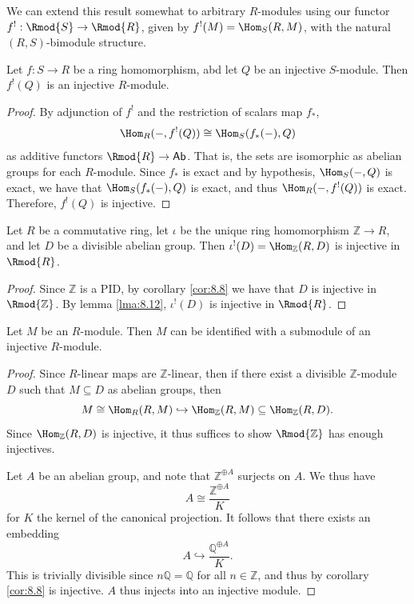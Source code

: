 We can extend this result somewhat to arbitrary $R$-modules using our functor $f^!: \Rmod{S}  \to \Rmod{R} $, given by $f^!(M)=\Hom_{S}(R, M) $, with the natural $(R,S)$-bimodule structure.
\begin{lemma}\label{lma:8.12}
	Let $f : S \to R$ be a ring homomorphism, abd let $Q$ be an injective $S$-module. Then $f^!(Q)$ is an injective $R$-module.
\end{lemma}
\begin{proof}
	By adjunction of $f^!$ and the restriction of scalars map $f_*$,
	\[
		\Hom_{R}(-, f^!(Q)) \cong \Hom_{S}(f_*(-), Q) 
	\]
	as additive functors $\Rmod{R} \to \mathsf{Ab} $. That is, the sets are isomorphic as abelian groups for each $R$-module. Since $f_*$ is exact and by hypothesis, $\Hom_{S}(-, Q) $ is exact, we have that $\Hom_{S}(f_*(-), Q) $ is exact, and thus $\Hom_{R}(-, f^!(Q)) $ is exact. Therefore, $f^!(Q)$ is injective.
\end{proof}
\begin{corollary}\label{cor:8.9}
	Let $R$ be a commutative ring, let $\iota $ be the unique ring homomorphism $\mathbb{Z} \to R$, and let $D$ be a divisible abelian group. Then $\iota ^!(D)=\Hom_{\mathbb{Z} }(R, D) $ is injective in $\Rmod{R} $.
\end{corollary}
\begin{proof}
	Since $\mathbb{Z} $ is a PID, by corollary \ref{cor:8.8} we have that $D$ is injective in $\Rmod{\mathbb{Z} } $. By lemma \ref{lma:8.12}, $\iota ^!(D)$ is injective in $\Rmod{R} $.
\end{proof}
\begin{corollary}\label{cor:8.10}
	Let $M$ be an $R$-module. Then $M$ can be identified with a submodule of an injective $R$-module.
\end{corollary}
\begin{proof}
	Since $R$-linear maps are $\mathbb{Z} $-linear, then if there exist a divisible $\mathbb{Z} $-module $D$ such that $M\subseteq D$ as abelian groups, then
	\[
		M\cong \Hom_{R}(R, M) \hookrightarrow \Hom_{\mathbb{Z} }(R, M) \subseteq \Hom_{\mathbb{Z} }(R, D) 
	.\]
	Since $\Hom_{\mathbb{Z} }(R, D) $ is injective, it thus suffices to show $\Rmod{\mathbb{Z} } $ has enough injectives.

	Let $A$ be an abelian group, and note that $\mathbb{Z} ^{\oplus A} $ surjects on $A$. We thus have
	\[
		A\cong \frac{\mathbb{Z} ^{\oplus A} }{K} 
	\]
	for $K$ the kernel of the canonical projection. It follows that there exists an embedding
	\[
		A\hookrightarrow \frac{\mathbb{Q} ^{\oplus A} }{K} 
	.\]
	This is trivially divisible since $n\mathbb{Q} =\mathbb{Q} $ for all $n\in\mathbb{Z} $, and thus by corollary \ref{cor:8.8} is injective. $A$ thus injects into an injective module.
\end{proof}


